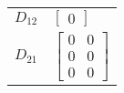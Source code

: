 \begin{tabular}{cl}
 $D_{12}$ & $\left[\begin{matrix}0\end{matrix}\right]$                                                                                                                                  \\
 $D_{21}$ & $\left[\begin{matrix}0 & 0\\0 & 0\\0 & 0\end{matrix}\right]$                                                                                                                \\
\hline
\end{tabular}